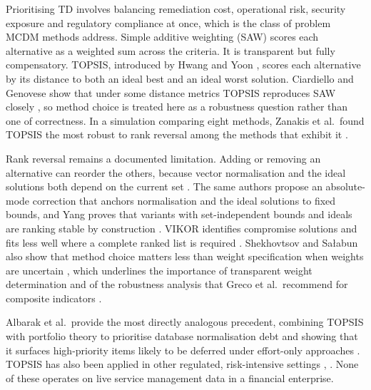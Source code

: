 \documentclass[
  journal,
]{IEEEtran}%
\begin{document}
Prioritising TD involves balancing remediation cost, operational risk,
security exposure and regulatory compliance at once, which is the class
of problem MCDM methods address. Simple additive weighting (SAW) scores
each alternative as a weighted sum across the criteria. It is
transparent but fully compensatory. TOPSIS, introduced by Hwang and Yoon
, scores each
alternative by its distance to both an ideal best and an ideal worst
solution. Ciardiello and Genovese show that under some distance metrics
TOPSIS reproduces SAW closely
, so method
choice is treated here as a robustness question rather than one of
correctness. In a simulation comparing eight methods, Zanakis et
al.~found TOPSIS the most robust to rank reversal among the methods that
exhibit it
.

Rank reversal remains a documented limitation. Adding or removing an
alternative can reorder the others, because vector normalisation and the
ideal solutions both depend on the current set
. The same
authors propose an absolute-mode correction that anchors normalisation
and the ideal solutions to fixed bounds, and Yang proves that variants
with set-independent bounds and ideals are ranking stable by
construction .
VIKOR identifies compromise solutions and fits less well where a
complete ranked list is required
.
Shekhovtsov and Sałabun also show that method choice matters less than
weight specification when weights are uncertain
, which
underlines the importance of transparent weight determination and of the
robustness analysis that Greco et al.~recommend for composite indicators
.

Albarak et al.~provide the most directly analogous precedent, combining
TOPSIS with portfolio theory to prioritise database normalisation debt
and showing that it surfaces high-priority items likely to be deferred
under effort-only approaches
. TOPSIS has
also been applied in other regulated, risk-intensive settings
,
. None of
these operates on live service management data in a financial
enterprise.
\end{document}
